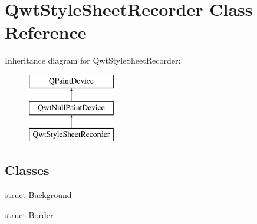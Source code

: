 \hypertarget{class_qwt_style_sheet_recorder}{\section{Qwt\-Style\-Sheet\-Recorder Class Reference}
\label{class_qwt_style_sheet_recorder}
}
Inheritance diagram for Qwt\-Style\-Sheet\-Recorder\-:\begin{figure}[H]
\begin{center}
\leavevmode
\includegraphics[height=3.000000cm]{class_qwt_style_sheet_recorder}
\end{center}
\end{figure}
\subsection*{Classes}
\begin{DoxyCompactItemize}
\item 
struct \hyperlink{struct_qwt_style_sheet_recorder_1_1_background}{Background}
\item 
struct \hyperlink{struct_qwt_style_sheet_recorder_1_1_border}{Border}
\end{DoxyCompactItemize}
